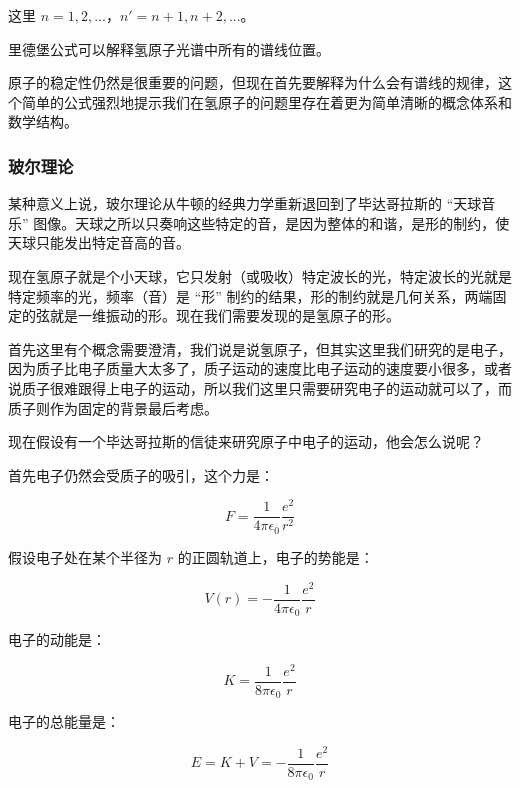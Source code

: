 这里 $n = 1,  2, ...$，$n' = n+1, n+2, ...$。

里德堡公式可以解释氢原子光谱中所有的谱线位置。

原子的稳定性仍然是很重要的问题，但现在首先要解释为什么会有谱线的规律，这个简单的公式强烈地提示我们在氢原子的问题里存在着更为简单清晰的概念体系和数学结构。

\subsubsection{玻尔理论}


某种意义上说，玻尔理论从牛顿的经典力学重新退回到了毕达哥拉斯的 “天球音乐” 图像。天球之所以只奏响这些特定的音，是因为整体的和谐，是形的制约，使天球只能发出特定音高的音。

现在氢原子就是个小天球，它只发射（或吸收）特定波长的光，特定波长的光就是特定频率的光，频率（音）是 “形” 制约的结果，形的制约就是几何关系，两端固定的弦就是一维振动的形。现在我们需要发现的是氢原子的形。

首先这里有个概念需要澄清，我们说是说氢原子，但其实这里我们研究的是电子，因为质子比电子质量大太多了，质子运动的速度比电子运动的速度要小很多，或者说质子很难跟得上电子的运动，所以我们这里只需要研究电子的运动就可以了，而质子则作为固定的背景最后考虑。

现在假设有一个毕达哥拉斯的信徒来研究原子中电子的运动，他会怎么说呢？

首先电子仍然会受质子的吸引，这个力是：

\begin{equation}
F = \frac{1}{4 \pi \epsilon_0} \frac{e^2}{ r^2 }
\end{equation}

假设电子处在某个半径为 $r$ 的正圆轨道上，电子的势能是：

\begin{equation}
V(r) = - \frac{1}{4 \pi \epsilon_0} \frac{e^2}{ r }
\end{equation}

电子的动能是：

\begin{equation}
K = \frac{1}{8 \pi \epsilon_0} \frac{e^2}{ r }
\end{equation}

电子的总能量是：

\begin{equation}
E = K + V = - \frac{1}{8 \pi \epsilon_0} \frac{e^2}{ r }
\end{equation}

